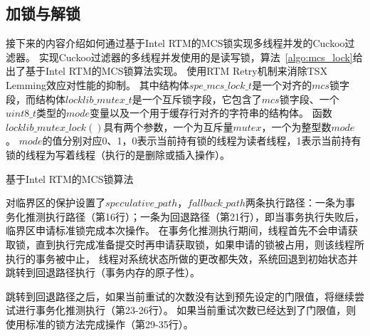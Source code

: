 \subsection{加锁与解锁}
接下来的内容介绍如何通过基于Intel RTM的MCS锁实现多线程并发的Cuckoo过滤器。
实现Cuckoo过滤器的多线程并发使用的是读写锁，算法~\ref{algo:mcs_lock}给出了基于Intel RTM的MCS锁算法实现。
使用RTM Retry机制来消除TSX Lemming效应对性能的抑制。
其中结构体$spe\_mcs\_lock\_t$是一个对齐的$mcs$锁字段，而结构体$locklib\_mutex\_t$是一个互斥锁字段，它包含了$mcs$锁字段、一个$uint8\_t$类型的$mode$变量以及一个用于缓存行对齐的字符串的结构体。
函数$locklib\_mutex\_lock()$具有两个参数，一个为互斥量$mutex$，一个为整型数$mode$。
$mode$的值分别对应0、1，0表示当前持有锁的线程为读者线程，1表示当前持有锁的线程为写着线程（执行的是删除或插入操作）。
\begin{algorithm}[htbp]
\SetAlgoLined
\caption{基于Intel RTM的MCS锁算法}
\label{algo:mcs_lock}
\end{algorithm}
对临界区的保护设置了$speculative\_path$，$fallback\_path$两条执行路径：一条为事务化推测执行路径（第16行）；一条为回退路径（第21行），即当事务执行失败后，临界区申请标准锁完成本次操作。
在事务化推测执行期间，线程首先不会申请获取锁，直到执行完成准备提交时再申请获取锁，如果申请的锁被占用，则该线程所执行的事务被中止，
线程对系统状态所做的更改都失效，系统回退到初始状态并跳转到回退路径执行（事务内存的原子性）。

跳转到回退路径之后，如果当前重试的次数没有达到预先设定的门限值，将继续尝试进行事务化推测执行（第23-26行）。
如果当前重试次数已经达到了门限值，则使用标准的锁方法完成操作（第29-35行）。

